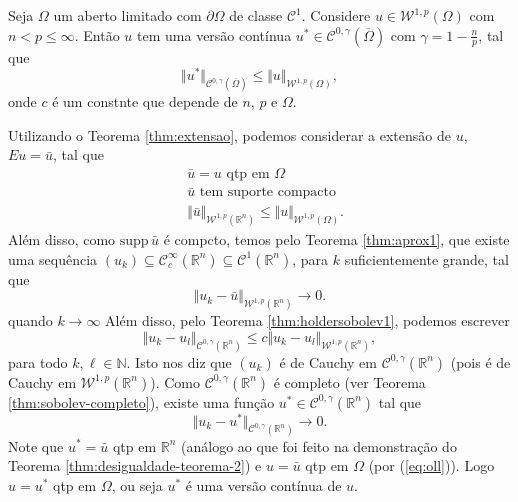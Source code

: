 \documentclass[a4paper, 11pt]{book}
\theoremstyle{definition}
\newcommand{\bN}{\mathbb{N}}
\newcommand{\bR}{\mathbb{R}}
\newcommand{\cC}{\mathcal{C}}
\newcommand{\cW}{\mathcal{W}}
\newcommand{\supp}{\mathrm{supp}\,}
\begin{document}
\begin{tbox}
    Seja $\Omega$ um aberto limitado com $\partial\Omega$ de classe $\cC^1$.
    Considere $u \in \cW^{1,p}(\Omega)$ com $n < p \leqslant \infty$.
    Então $u$ tem uma versão contínua $u^* \in \cC^{0,\gamma}(\overline\Omega)$ com $\gamma = 1 - \frac{n}{p}$, tal que
    \[
        \Vert u^*  \Vert_{\cC^{0,\gamma}(\overline\Omega)} \leqslant \Vert u \Vert_{\cW^{1,p}(\Omega)},
    \]
    onde $c$ é um constnte que depende de $n$, $p$ e $\Omega$.
\end{tbox}
\begin{prf}
    Utilizando o Teorema \ref{thm:extensao}, podemos considerar a extensão de $u$, $Eu = \bar u$, tal que
    \begin{equation} \label{eq:oll}
        \begin{aligned}
            &\bar u = u \text{ qtp em } \Omega\\
            &\bar u \text{ tem suporte compacto}\\
            &\Vert \bar u \Vert_{\cW^{1,p}(\bR^n)} \leqslant \Vert u \Vert_{\cW^{1,p}(\Omega)}.
        \end{aligned}
    \end{equation}
    Além disso, como $\supp \bar u$ é compcto, temos pelo Teorema \ref{thm:aprox1}, que existe uma sequência $(u_k) \subseteq \cC^\infty_c(\bR^n) \subseteq \cC^1(\bR^n)$, para $k$ suficientemente grande, tal que
    \begin{equation} \label{eq:oll1}
        \Vert u_k - \bar u \Vert_{\cW^{1,p}(\bR^n)} \to 0.
    \end{equation}
    quando $k \to \infty$
    Além disso, pelo Teorema \ref{thm:holdersobolev1}, podemos escrever
    \[
        \Vert u_k -u_l \Vert_{\cC^{0,\gamma}(\bR^n)} \leqslant c \Vert u_k - u_l \Vert_{\cW^{1,p}(\bR^n)},
    \]
    para todo $k, \ell \in \bN$.
    Isto nos diz que $(u_k)$ é de Cauchy em $\cC^{0,\gamma}(\bR^n)$ (pois é de Cauchy em $\cW^{1,p}(\bR^n)$).
    Como $\cC^{0,\gamma}(\bR^n)$ é completo (ver Teorema \ref{thm:sobolev-completo}), existe uma função $u^* \in \cC^{0,\gamma}(\bR^n)$ tal que
    \begin{equation} \label{eq:oll2}
        \Vert u_k - u^* \Vert_{\cC^{0,\gamma}(\bR^n)} \to 0.
    \end{equation}
    Note que $u^* = \bar u$ qtp em $\bR^n$ (análogo ao que foi feito na demonstração do Teorema \ref{thm:desigualdade-teorema-2}) e $u = \bar u$ qtp em $\Omega$ (por (\ref{eq:oll})).
    Logo $u = u^*$ qtp em $\Omega$, ou seja $u^*$ é uma versão contínua de $u$.

\end{prf}
\end{document}

